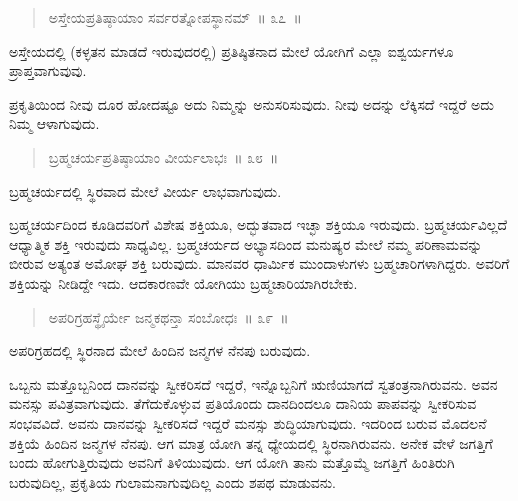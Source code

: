 \vspace{-0.3cm}

\begin{verse}
ಅಸ್ತೇಯಪ್ರತಿಷ್ಠಾಯಾಂ ಸರ್ವರತ್ನೋಪಸ್ಥಾನಮ್​~॥ ೩೭~॥
\end{verse}

\vspace{-0.3cm}

ಅಸ್ತೇಯದಲ್ಲಿ (ಕಳ್ಳತನ ಮಾಡದೆ ಇರುವುದರಲ್ಲಿ) ಪ್ರತಿಷ್ಠಿತನಾದ ಮೇಲೆ ಯೋಗಿಗೆ ಎಲ್ಲಾ ಐಶ್ವರ್ಯಗಳೂ ಪ್ರಾಪ್ತವಾಗುವುವು. 

ಪ್ರಕೃತಿಯಿಂದ ನೀವು ದೂರ ಹೋದಷ್ಟೂ ಅದು ನಿಮ್ಮನ್ನು ಅನುಸರಿಸುವುದು. ನೀವು ಅದನ್ನು ಲೆಕ್ಕಿಸದೆ ಇದ್ದರೆ ಅದು ನಿಮ್ಮ ಆಳಾಗುವುದು. 

\vspace{-0.3cm}

\begin{verse}
ಬ್ರಹ್ಮಚರ್ಯಪ್ರತಿಷ್ಠಾಯಾಂ ವೀರ್ಯಲಾಭಃ~॥ ೩೮~॥
\end{verse}

\vspace{-0.3cm}

ಬ್ರಹ್ಮಚರ್ಯದಲ್ಲಿ ಸ್ಥಿರವಾದ ಮೇಲೆ ವೀರ್ಯ ಲಾಭವಾಗುವುದು. 

ಬ್ರಹ್ಮಚರ್ಯದಿಂದ ಕೂಡಿದವರಿಗೆ ವಿಶೇಷ ಶಕ್ತಿಯೂ, ಅದ್ಭುತವಾದ ಇಚ್ಛಾ ಶಕ್ತಿಯೂ ಇರುವುದು. ಬ್ರಹ್ಮಚರ್ಯವಿಲ್ಲದೆ ಆಧ್ಯಾತ್ಮಿಕ ಶಕ್ತಿ ಇರುವುದು ಸಾಧ್ಯವಿಲ್ಲ. ಬ್ರಹ್ಮಚರ್ಯದ ಅಭ್ಯಾಸದಿಂದ ಮನುಷ್ಯರ ಮೇಲೆ ನಮ್ಮ ಪರಿಣಾಮವನ್ನು ಬೀರುವ ಅತ್ಯಂತ ಅಮೋಘ ಶಕ್ತಿ ಬರುವುದು. ಮಾನವರ ಧಾರ್ಮಿಕ ಮುಂದಾಳುಗಳು ಬ್ರಹ್ಮಚಾರಿಗಳಾಗಿದ್ದರು. ಅವರಿಗೆ ಶಕ್ತಿಯನ್ನು ನೀಡಿದ್ದೇ ಇದು. ಆದಕಾರಣವೇ ಯೋಗಿಯು ಬ್ರಹ್ಮಚಾರಿಯಾಗಿರಬೇಕು. 

\vspace{-0.3cm}

\begin{verse}
ಅಪರಿಗ್ರಹಸ್ಥೈರ್ಯೇ ಜನ್ಮಕಥನ್ತಾ ಸಂಬೋಧಃ~॥ ೩೯~॥
\end{verse}

\vspace{-0.3cm}

ಅಪರಿಗ್ರಹದಲ್ಲಿ ಸ್ಥಿರನಾದ ಮೇಲೆ ಹಿಂದಿನ ಜನ್ಮಗಳ ನೆನಪು ಬರುವುದು. 

ಒಬ್ಬನು ಮತ್ತೊಬ್ಬನಿಂದ ದಾನವನ್ನು ಸ್ವೀಕರಿಸದೆ ಇದ್ದರೆ, ಇನ್ನೊಬ್ಬನಿಗೆ ಋಣಿಯಾಗದೆ ಸ್ವತಂತ್ರನಾಗಿರುವನು. ಅವನ ಮನಸ್ಸು ಪವಿತ್ರವಾಗುವುದು. ತೆಗೆದುಕೊಳ್ಳುವ ಪ್ರತಿಯೊಂದು ದಾನದಿಂದಲೂ ದಾನಿಯ ಪಾಪವನ್ನು ಸ್ವೀಕರಿಸುವ ಸಂಭವವಿದೆ. ಅವನು ದಾನವನ್ನು ಸ್ವೀಕರಿಸದೆ ಇದ್ದರೆ ಮನಸ್ಸು ಶುದ್ಧಿಯಾಗುವುದು. ಇದರಿಂದ ಬರುವ ಮೊದಲನೆ ಶಕ್ತಿಯೆ ಹಿಂದಿನ ಜನ್ಮಗಳ ನೆನಪು. ಆಗ ಮಾತ್ರ ಯೋಗಿ ತನ್ನ ಧ್ಯೇಯದಲ್ಲಿ ಸ್ಥಿರನಾಗಿರುವನು. ಅನೇಕ ವೇಳೆ ಜಗತ್ತಿಗೆ ಬಂದು ಹೋಗುತ್ತಿರುವುದು ಅವನಿಗೆ ತಿಳಿಯುವುದು. ಆಗ ಯೋಗಿ ತಾನು ಮತ್ತೊಮ್ಮೆ ಜಗತ್ತಿಗೆ ಹಿಂತಿರುಗಿ ಬರುವುದಿಲ್ಲ, ಪ್ರಕೃತಿಯ ಗುಲಾಮನಾಗುವುದಿಲ್ಲ ಎಂದು ಶಪಥ ಮಾಡುವನು. 

\vspace{-0.3cm}

